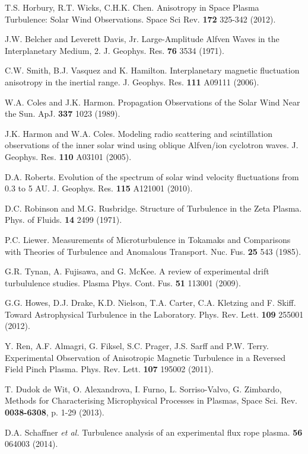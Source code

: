 \documentclass[aps,prl,amsmath,amssymb,reprint,superscriptaddress]{revtex4-1} %
\begin{document}
\begin{thebibliography}{99}
 T.S. Horbury, R.T. Wicks, C.H.K. Chen. Anisotropy in Space Plasma Turbulence: Solar Wind Observations. Space Sci Rev. {\bf 172} 325-342 (2012).

 J.W. Belcher and Leverett Davis, Jr. Large-Amplitude Alfven Waves in the Interplanetary Medium, 2. J. Geophys. Res. {\bf 76} 3534 (1971).

 C.W. Smith, B.J. Vasquez and K. Hamilton. Interplanetary magnetic fluctuation anisotropy in the inertial range. J. Geophys. Res. {\bf 111} A09111 (2006).

 W.A. Coles and J.K. Harmon. Propagation Observations of the Solar Wind Near the Sun. ApJ. {\bf 337} 1023 (1989).

 J.K. Harmon and W.A. Coles. Modeling radio scattering and scintillation observations of the inner solar wind using oblique Alfven/ion cyclotron waves. J. Geophys. Res. {\bf 110} A03101 (2005).

 D.A. Roberts. Evolution of the spectrum of solar wind velocity fluctuations from 0.3 to 5 AU. J. Geophys. Res. {\bf 115} A121001 (2010).

 D.C. Robinson and M.G. Rusbridge. Structure of Turbulence in the Zeta Plasma. Phys. of Fluids. {\bf 14} 2499 (1971).

 P.C. Liewer. Measurements of Microturbulence in Tokamaks and Comparisons with Theories of Turbulence and Anomalous Transport. Nuc. Fus. {\bf 25} 543 (1985).

 G.R. Tynan, A. Fujisawa, and G. McKee. A review of experimental drift turbululence studies. Plasma Phys. Cont. Fus. {\bf 51} 113001 (2009).

 G.G. Howes, D.J. Drake, K.D. Nielson, T.A. Carter, C.A. Kletzing and F. Skiff. Toward Astrophysical Turbulence in the Laboratory. Phys. Rev. Lett. {\bf 109} 255001 (2012).

 Y. Ren, A.F. Almagri, G. Fiksel, S.C. Prager, J.S. Sarff and P.W. Terry. Experimental Observation of Anisotropic Magnetic Turbulence in a Reversed Field Pinch Plasma. Phys. Rev. Lett. {\bf 107} 195002 (2011).

 T. Dudok de Wit, O. Alexandrova, I. Furno, L. Sorriso-Valvo, G. Zimbardo, Methods for Characterising Microphysical Processes in Plasmas, Space Sci. Rev. {\bf 0038-6308}, p. 1-29 (2013).

 D.A. Schaffner {\it et al.} Turbulence analysis of an experimental flux rope plasma. {\bf 56} 064003 (2014).


\end{thebibliography}
\end{document}
